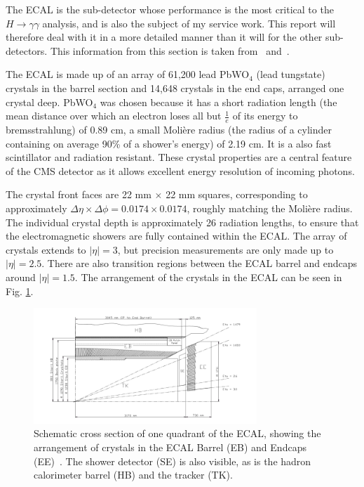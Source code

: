 \documentclass[10pt]{article}
\begin{document}
The ECAL is the sub-detector whose performance is the most critical to the $H \rightarrow \gamma \gamma$ analysis, and is also the subject of my service work. This report will therefore deal with it in a more detailed manner than it will for the other sub-detectors. This information from this section is taken from~\cite{CMSTDR} and~\cite{cmsEcal}.

The ECAL is made up of an array of 61,200 lead PbWO$_4$ (lead tungstate) crystals in the barrel section and 14,648 crystals in the end caps, arranged one crystal deep. PbWO$_4$ was chosen because it has a short radiation length (the mean distance over which an electron loses all but $\frac{1}{e}$ of its energy to bremsstrahlung) of 0.89 cm, a small Molière radius (the radius of a cylinder containing on average 90\% of a shower's energy) of 2.19 cm. It is a also fast scintillator and radiation resistant. These crystal properties are a central feature of the CMS detector as it allows excellent energy resolution of incoming photons. 

The crystal front faces are 22 mm $\times$ 22 mm squares, corresponding to approximately $\Delta \eta \times \Delta \phi = 0.0174 \times 0.0174$, roughly matching the Molière radius. The individual crystal depth is approximately 26 radiation lengths, to ensure that the electromagnetic showers are fully contained within the ECAL. The array of crystals extends to $|\eta| =3$, but precision measurements are only made up to $|\eta| =2.5$. There are also transition regions between the ECAL barrel and endcaps around $|\eta| =1.5$. The arrangement of the crystals in the ECAL can be seen in Fig. \ref{ecal}.

\begin{figure}[h]
  \centering
  \includegraphics[width=0.75\textwidth]{"EcalEBEE"}
  \caption{Schematic cross section of one quadrant of the ECAL, showing the arrangement of crystals in the ECAL Barrel (EB) and Endcaps (EE)~\cite{cmsEcal}. The shower detector (SE) is also visible, as is the hadron calorimeter barrel (HB) and the tracker (TK).}
  \label{ecal}
\end{figure}
\end{document}
